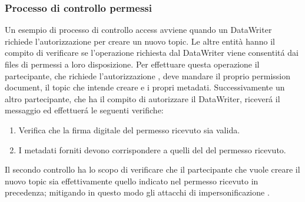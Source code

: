\subsubsection{Processo di controllo permessi}
Un esempio di processo di controllo access avviene
quando un DataWriter richiede l'autorizzazione per creare un nuovo topic.
Le altre entità hanno il compito di verificare se l'operazione 
richiesta dal DataWriter viene consentitá
dai files di permessi a loro disposizione. Per effettuare 
questa operazione il partecipante, che richiede l'autorizzazione ,
deve mandare il proprio permission document, il topic che intende creare e 
i propri metadati. Successivamente un altro partecipante,
che ha il compito di autorizzare il DataWriter,
riceverá il messaggio ed effettuerá le seguenti
verifiche:
\begin{enumerate}
    \item Verifica che la firma digitale del permesso ricevuto sia valida.
    \item I metadati forniti devono corrispondere a quelli del del 
    permesso ricevuto.
\end{enumerate}
Il secondo controllo ha lo scopo di verificare
che il partecipante che vuole creare il 
nuovo topic sia effettivamente quello indicato nel permesso 
ricevuto in precedenza; mitigando in questo modo gli attacchi di 
impersonificazione 
\cite{DBLP:conf/asiaccs/WangLG24}.
